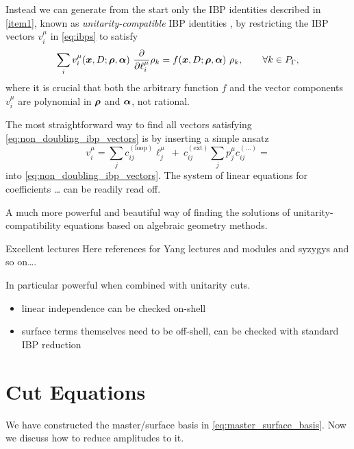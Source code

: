 Instead we can generate from the start only the IBP identities described in \cref{item1},
known as \emph{unitarity-compatible} IBP identities \cite{Ita:2015tya,Abreu:2017xsl,Gluza:2010ws,Schabinger:2011dz,Larsen:2015ped}, by
restricting the IBP vectors $v_i^\mu$ in \cref{eq:ibps} to satisfy
\begin{equation} \label{eq:non_doubling_ibp_vectors}
  \sum_i v_i^\mu(\vb*{x},D;\vb*{\rho},\vb*{\alpha}) ~ \pdv{\ell^\mu_i} \rho_k = f(\vb*{x},D;\vb*{\rho},\vb*{\alpha}) ~ \rho_k, \qquad \forall k\in P_\Gamma,
\end{equation}
where it is crucial that both the arbitrary function $f$ and the vector components $v_i^\mu$ are polynomial in $\vb*{\rho}$ and $\vb*{\alpha}$, not rational.

The most straightforward way to find all vectors satisfying \cref{eq:non_doubling_ibp_vectors} 
is by inserting a simple ansatz
\begin{equation}
  v_i^\mu = \sum_{j}^{}c^{(\text{loop})}_{ij}\ell^\mu_j ~+~ c^{(\text{ext})}_{ij} \sum_{j}^{}p^\mu_j
    c_{ij}^{(\ldots{})} = 
\end{equation}
into \cref{eq:non_doubling_ibp_vectors}.
The system of linear equations for coefficients \ldots{} can be readily read off.

A much more powerful and beautiful way of finding the solutions of unitarity-compatibility equations based on algebraic geometry methods.

Excellent lectures
Here references for Yang lectures and modules and syzygys and so on\ldots{}.

In particular powerful when combined with unitarity cuts.





\begin{itemize}
  \item linear independence can be checked on-shell
  \item surface terms themselves need to be off-shell, can be checked with standard IBP reduction
\end{itemize}


\section{Cut Equations}

We have constructed the master/surface basis in \cref{eq:master_surface_basis}. Now we discuss how
to reduce amplitudes to it.

